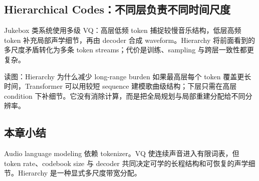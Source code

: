 \subsection{Hierarchical Codes：不同层负责不同时间尺度}

Jukebox 类系统使用多级 VQ：高层低频 token 捕捉较慢音乐结构，低层高频 token 补充局部声学细节，再由 decoder 合成 waveform。Hierarchy 将前面看到的多尺度矛盾转化为多条 token streams；代价是训练、sampling 与跨层一致性都更复杂。


\begin{knowledgebox}{读图：Hierarchy 为什么减少 long-range burden}
如果最高层每个 token 覆盖更长时间，Transformer 可以用较短 sequence 建模歌曲级结构；下层只需在高层 condition 下补细节。它没有消除计算，而是把全局规划与局部重建分配给不同分辨率。
\end{knowledgebox}


\subsection{本章小结}

Audio language modeling 依赖 tokenizer。VQ 使连续声音进入有限词表，但 token rate、codebook size 与 decoder 共同决定可学的长程结构和可恢复的声学细节。Hierarchy 是一种显式多尺度带宽分配。

